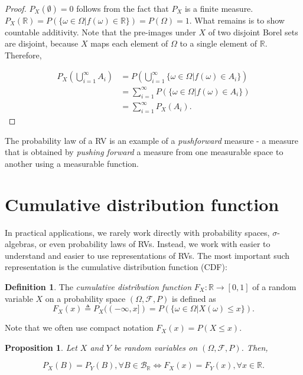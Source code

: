 \documentclass{book}
\theoremstyle{plain}%
\newtheorem{proposition}{Proposition}[section]
\theoremstyle{definition}
\newtheorem{definition}{Definition}[section]
\newlength{\arrow}
\begin{document}
\begin{proof}
$P_X(\emptyset) = 0$ follows from the fact that $P_X$ is a finite measure. $P_X(\mathbb{R}) = P(\{\omega \in \Omega | f(\omega) \in \mathbb{R}\}) = P(\Omega) = 1$. What remains is to show countable additivity. Note that the pre-images under $X$ of two disjoint Borel sets are disjoint, because $X$ maps each element of $\Omega$ to a single element of $\mathbb{R}$. Therefore,

\begin{align*}
    P_X(\bigcup_{i=1}^\infty A_i) &= P(\bigcup_{i=1}^\infty  \{\omega \in \Omega | f(\omega) \in A_i\}) \\
    &= \sum_{i=1}^\infty P(\{\omega \in \Omega | f(\omega) \in A_i\}) \\ 
    &= \sum_{i=1}^\infty P_X(A_i).
\end{align*}

\end{proof}

The probability law of a RV is an example of a \emph{pushforward} measure - a measure that is obtained by \emph{pushing forward} a measure from one measurable space to another using a measurable function.

\section{Cumulative distribution function}

In practical applications, we rarely work directly with probability spaces, $\sigma$-algebras, or even probability laws of RVs. Instead, we work with easier to understand and easier to use representations of RVs. The most important such representation is the cumulative distribution function (CDF): 

\begin{definition}The \textit{cumulative distribution function} $F_X: \mathbb{R} \rightarrow [0, 1]$ of a random variable $X$ on a probability space $(\Omega, \mathcal{F}, P)$ is defined as $$F_X(x) \triangleq P_X((-\infty,x]) = P(\{\omega \in \Omega | X(\omega) \leq x\}) .$$
\end{definition}

Note that we often use compact notation $F_X(x) = P(X \leq x)$.

\begin{proposition}
Let $X$ and $Y$ be random variables on $(\Omega, \mathcal{F}, P)$. Then,

$$P_X(B) = P_Y(B), \forall B \in \mathcal{B}_\mathbb{R} \Longleftrightarrow F_X(x) = F_Y(x),  \forall x \in \mathbb{R}.$$

\end{proposition}
\end{document}
